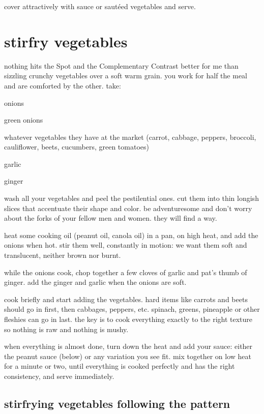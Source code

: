 cover attractively with sauce or saut\'{e}ed vegetables and serve.

\section{stirfry vegetables}

nothing hits the Spot and the Complementary Contrast better for me than 
sizzling crunchy vegetables over a soft warm grain. you work for half the 
meal and are comforted by the other. take:

\begin{ingredients}
  \item onions
  \item green onions
  \item whatever vegetables they have at the market (carrot, cabbage, peppers, 
  broccoli, cauliflower, beets, cucumbers, green tomatoes)
  \item garlic
  \item ginger
\end{ingredients}
wash all your vegetables and peel the pestilential ones. cut them into thin longish slices that accentuate their shape and color. be adventuresome and don't worry about the forks of your fellow men and women. they will find a way.

heat some cooking oil (peanut oil, canola oil) in a pan, on high heat, and 
add the onions when hot. stir them well, constantly in motion: we want them 
soft and translucent, neither brown nor burnt.

while the onions cook, chop together a few cloves of garlic and pat's thumb 
of ginger. add the ginger and garlic when the onions are soft.

cook briefly and start adding the vegetables. hard items like carrots and 
beets should go in first, then cabbages, peppers, etc. spinach, greens, 
pineapple or other fleshies can go in last. the key is to cook everything 
exactly to the right texture so nothing is raw and nothing is mushy.

when everything is almost done, turn down the heat and add your sauce: 
either the peanut sauce (below) or any variation you see fit. mix together 
on low heat for a minute or two, until everything is cooked perfectly and has 
the right consistency, and serve immediately.

\subsection{stirfrying vegetables following the pattern}

